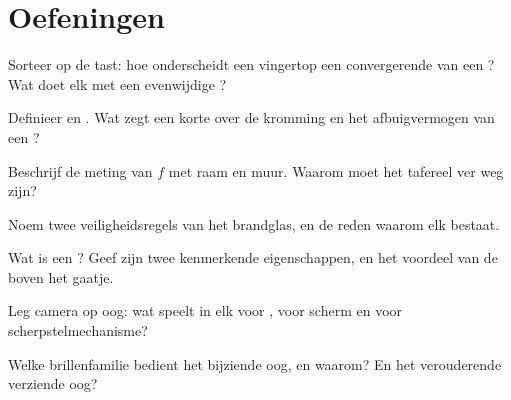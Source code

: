\section{Oefeningen}

\begin{exercise}[$\star$]\label{exo:g8:lenses-images:1}
Sorteer op de tast: hoe onderscheidt een vingertop een convergerende
van een ? Wat doet elk met een evenwijdige
?
\end{exercise}

\begin{exercise}[$\star$]\label{exo:g8:lenses-images:2}
Definieer  en . Wat zegt
een korte  over de kromming en het
afbuigvermogen van een ?
\end{exercise}

\begin{exercise}[$\star$]\label{exo:g8:lenses-images:3}
Beschrijf de meting van $f$ met raam en muur. Waarom moet het tafereel
ver weg zijn?
\end{exercise}

\begin{exercise}[$\star$]\label{exo:g8:lenses-images:4}
Noem twee veiligheidsregels van het brandglas, en de reden waarom elk
bestaat.
\end{exercise}

\begin{exercise}[$\star$]\label{exo:g8:lenses-images:5}
Wat is een ? Geef zijn twee kenmerkende
eigenschappen, en het voordeel van de  boven het gaatje.
\end{exercise}

\begin{exercise}[$\star$]\label{exo:g8:lenses-images:6}
Leg camera op oog: wat speelt in elk voor , voor scherm en
voor scherpstelmechanisme?
\end{exercise}

\begin{exercise}[$\star$]\label{exo:g8:lenses-images:7}
Welke brillenfamilie bedient het bijziende oog, en waarom? En het
verouderende verziende oog?
\end{exercise}

